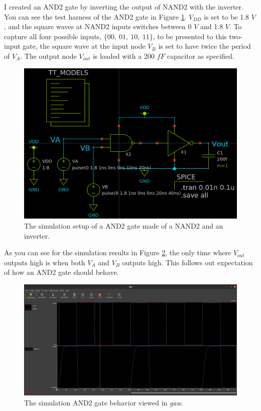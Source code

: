 \documentclass[11pt]{article}
\begin{document}
    \FloatBarrier
    I created an AND2 gate by inverting the output of NAND2 with the inverter. You can see the test harness of the AND2 gate in Figure \ref{fig:and2}. $V_{DD}$ is set to be 1.8 $V$, and the square waves at NAND2 inputs switches between 0 $V$ and 1.8 $V$. To capture all four possible inputs, $\{00,\ 01,\ 10,\ 11\}$, to be presented to this two-input gate, the square wave at the input node $V_B$ is set to have twice the period of $V_A$. The output node $V_{out}$ is loaded with a 200 $fF$ capacitor as specified.
    \begin{figure}[!ht]
        \includegraphics[width=\linewidth]{AND2_harness.png}
        \caption{The simulation setup of a AND2 gate made of a NAND2 and an inverter.}
        \label{fig:and2}
    \end{figure}

    As you can see for the simulation results in Figure \ref{fig:and2res}, the only time where $V_{out}$ outputs high is when both $V_A$ and $V_B$ outputs high. This follows out expectation of how an AND2 gate should behave.
	\begin{figure}[!ht]
        \includegraphics[width=\linewidth]{AND2_sim.png}
        \caption{The simulation AND2 gate behavior viewed in \textit{gaw}.}
        \label{fig:and2res}
    \end{figure}
\end{document}
